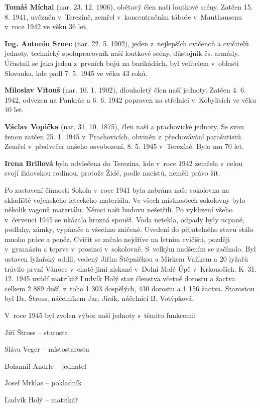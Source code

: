 \documentclass[a5paper, 12pt, twoside]{article}
\begin{document}
\textbf{Tomáš Míchal} (nar. 23. 12. 1906), obětavý člen naší loutkové
scény. Zatčen 15. 8. 1941, uvězněn v~Terezíně, zemřel v~koncentračním
táboře v~Mauthausenu v~roce 1942 ve věku 36 let.

\textbf{Ing. Antonín Srnec} (nar. 22. 5. 1902), jeden z~nejlepších
cvičenců a cvičitelů jednoty, technický spolupracovník naší loutkové
scény, důstojník čs. armády. Účastnil se jako jeden z~prvních bojů na
barikádách, byl velitelem v~oblasti Slovanka, kde padl 7. 5. 1945 ve
věku 43 roků.

\textbf{Miloslav Vitouš} (nar. 10. 1. 1902), dlouholetý člen naší
jednoty. Zatčen 4. 6. 1942, odvezen na Pankrác a 6. 6. 1942 popraven na
střelnici v~Kobylisích ve věku 40 let.

\textbf{Václav Vopička} (nar. 31. 10. 1875), člen naší a prachovické
jednoty. Se svou ženou zatčen 25. 1. 1945 v~Prachovicích, obviněn
z~přechovávání parašutistů. Zemřel v~předvečer našeho osvobození, 8. 5.
1945 v~Terezíně. Bylo mu 70 let.

\textbf{Irena Brillová} byla odvlečena do Terezína, kde v~roce 1942
zemřela s~celou svojí židovskou rodinou, protože Židé, podle nacistů,
neměli právo žít.

Po zastavení činnosti Sokola v~roce 1941 byla zabrána naše sokolovna na
skladiště vojenského leteckého materiálu. Ve všech místnostech sokolovny
bylo několik vagonů materiálu. Němci naši budovu nešetřili. Po vyklizení
všeho v~červenci 1945 se ukázala hrozná spoušť. Voda netekla, odpady
byly ucpané, podlahy, zámky, vypínače a všechno zničené. Uvedení do
přijatelného stavu stálo mnoho práce a peněz. Cvičit se začalo nejdříve
na letním cvičišti, později v~gymnáziu a teprve v~prosinci v~sokolovně.
S~velkým nadšením se začínalo. Byl ustaven lyžařský oddíl, vedený Jiřím
Štěpničkou a Mirkem Vaňkem a 20 lyžařů trávilo první Vánoce v~chatě jimi
získané v~Dolní Malé Úpě v~Krkonoších. K~31. 12. 1945 uvádí matrikář
Ludvík Holý stav členstva včetně dorostu a žactva celkem 2 889 duší,
z~toho 1 303 dospělých, 430 dorostu a 1 156 žactva. Starostou byl Dr.
Štross, náčelníkem Jar. Jirák, náčelnicí B. Votýpková.

V~roce 1945 byl zvolen výbor naší jednoty s~těmito funkcemi:

Jiří Štross -- starosta

Sláva Veger -- místostarosta

Bohumil Andrle -- jednatel

Josef Mrklas -- pokladník

Ludvík Holý -- matrikář
\end{document}
